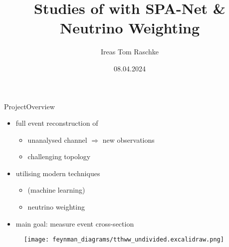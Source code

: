 \documentclass[9pt, aspectratio=169]{beamer}
\title{Studies of \ttHWW with SPA-Net \& Neutrino Weighting}
\date{08.04.2024}
\author{Ireas Tom Raschke}
\institute{II.\ Physikalisches Institut, Univ.\ of Göttingen}
\begin{document}
\begin{frame}
	\fontsize{11pt}{14pt}\selectfont
	\titlepage
\end{frame}

\begin{frame}{Project}{Overview}
	\begin{minipage}{.58\textwidth}
		\begin{itemize}
			\item full event reconstruction of \ttHWW
			\begin{itemize}
				\item unanalysed channel $\Rightarrow$ new observations
				\item challenging topology
			\end{itemize}
			\item utilising modern techniques 
			\begin{itemize}
				\item \spanet (machine learning)
				\item neutrino weighting
			\end{itemize}  
			\item main goal: measure event cross-section
		\end{itemize}
	\end{minipage}
	\begin{minipage}{.4\textwidth}
		\begin{figure}
			\centering
			\texttt{[image: feynman\_diagrams/tthww\_undivided.excalidraw.png]}
		\end{figure}
	\end{minipage}       	
\end{frame}
\end{document}
